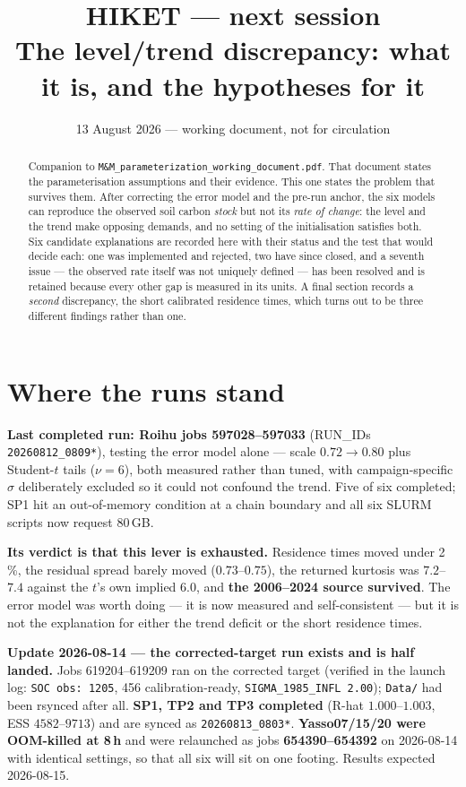 \documentclass[11pt]{article}
\title{HIKET --- next session\\
  \large The level/trend discrepancy: what it is, and the hypotheses for it}
\author{}
\date{13 August 2026 --- working document, not for circulation}
\begin{document}
\maketitle

\begin{abstract}
\noindent Companion to \texttt{M\&M\_parameterization\_working\_document.pdf}. That document
states the parameterisation assumptions and their evidence. This one states the problem that
survives them. After correcting the error model and the pre-run anchor, the six models can
reproduce the observed soil carbon \emph{stock} but not its \emph{rate of change}: the level and
the trend make opposing demands, and no setting of the initialisation satisfies both. Six
candidate explanations are recorded here with their status and the test that would decide each: one
was implemented and rejected, two have since closed, and a seventh issue ---
the observed rate itself was not uniquely defined --- has been resolved and is retained because every
other gap is measured in its units. A final section records a \emph{second} discrepancy, the short
calibrated residence times, which turns out to be three different findings rather than one.
\end{abstract}

\section{Where the runs stand}

\textbf{Last completed run: Roihu jobs 597028--597033} (RUN\_IDs \texttt{20260812\_0809*}), testing
the error model alone --- scale $0.72\rightarrow0.80$ plus Student-$t$ tails ($\nu=6$), both measured
rather than tuned, with campaign-specific $\sigma$ deliberately excluded so it could not confound the
trend. Five of six completed; SP1 hit an out-of-memory condition at a chain boundary and all six
SLURM scripts now request 80\,GB.

\textbf{Its verdict is that this lever is exhausted.} Residence times moved under 2\,\%, the residual
spread barely moved ($0.73$--$0.75$), the returned kurtosis was $7.2$--$7.4$ against the $t$'s own
implied $6.0$, and \textbf{the 2006--2024 source survived}. The error model was worth doing --- it is
now measured and self-consistent --- but it is not the explanation for either the trend deficit or
the short residence times.

\textbf{Update 2026-08-14 --- the corrected-target run exists and is half landed.} Jobs
619204--619209 ran on the corrected target (verified in the launch log: \texttt{SOC obs: 1205},
456 calibration-ready, \texttt{SIGMA\_1985\_INFL 2.00}); \texttt{Data/} had been rsynced after all.
\textbf{SP1, TP2 and TP3 completed} (R-hat $1.000$--$1.003$, ESS $4582$--$9713$) and are synced as
\texttt{20260813\_0803*}. \textbf{Yasso07/15/20 were OOM-killed at 8\,h} and were relaunched as
jobs \textbf{654390--654392} on 2026-08-14 with identical settings, so that all six will sit on one
footing. Results expected 2026-08-15.
\end{document}

